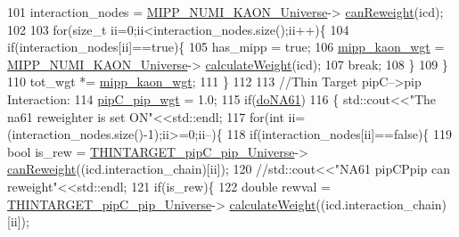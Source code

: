 \begin{DoxyCode}
101       interaction\_nodes = \hyperlink{class_neutrino_flux_reweight_1_1_reweight_driver_a58a8d80767fec9b87d60c1b548571d8b}{MIPP\_NUMI\_KAON\_Universe}->
      \hyperlink{class_neutrino_flux_reweight_1_1_m_i_p_p_numi_kaon_yields_reweighter_a6ca3bcd0846fd600f51988a2e396aafb}{canReweight}(icd);
102 
103       \textcolor{keywordflow}{for}(\textcolor{keywordtype}{size\_t} ii=0;ii<interaction\_nodes.size();ii++)\{
104         \textcolor{keywordflow}{if}(interaction\_nodes[ii]==\textcolor{keyword}{true})\{
105           has\_mipp = \textcolor{keyword}{true};
106           \hyperlink{class_neutrino_flux_reweight_1_1_reweight_driver_a908938bcd5304de35956da51a806ef62}{mipp\_kaon\_wgt} = \hyperlink{class_neutrino_flux_reweight_1_1_reweight_driver_a58a8d80767fec9b87d60c1b548571d8b}{MIPP\_NUMI\_KAON\_Universe}->
      \hyperlink{class_neutrino_flux_reweight_1_1_m_i_p_p_numi_kaon_yields_reweighter_ad9503e13848e30f432c297ed70e24134}{calculateWeight}(icd);
107           \textcolor{keywordflow}{break}; 
108         \}
109       \}
110       tot\_wgt *= \hyperlink{class_neutrino_flux_reweight_1_1_reweight_driver_a908938bcd5304de35956da51a806ef62}{mipp\_kaon\_wgt};
111     \}
112 
113 \textcolor{comment}{//Thin Target pipC-->pip Interaction:}
114   \hyperlink{class_neutrino_flux_reweight_1_1_reweight_driver_a61de96d5fb96639323a271dcf0677be0}{pipC\_pip\_wgt} = 1.0;
115   \textcolor{keywordflow}{if}(\hyperlink{class_neutrino_flux_reweight_1_1_reweight_driver_a2bf534e3c1edd88075c4cf720390e2df}{doNA61})
116    \{ std::cout<<\textcolor{stringliteral}{"The na61 reweighter is set ON"}<<std::endl;
117     \textcolor{keywordflow}{for}(\textcolor{keywordtype}{int} ii=(interaction\_nodes.size()-1);ii>=0;ii--)\{
118       \textcolor{keywordflow}{if}(interaction\_nodes[ii]==\textcolor{keyword}{false})\{
119         \textcolor{keywordtype}{bool} is\_rew = \hyperlink{class_neutrino_flux_reweight_1_1_reweight_driver_aee325ba668d837970619500d1fc081eb}{THINTARGET\_pipC\_pip\_Universe}->
      \hyperlink{class_neutrino_flux_reweight_1_1_thin_targetpip_cpip_reweighter_a0a7a18f342e8c88715671e3804dbd1ca}{canReweight}((icd.interaction\_chain)[ii]);
120     \textcolor{comment}{//std::cout<<"NA61 pipCPpip can reweight"<<std::endl;}
121         \textcolor{keywordflow}{if}(is\_rew)\{
122           \textcolor{keywordtype}{double} rewval = \hyperlink{class_neutrino_flux_reweight_1_1_reweight_driver_aee325ba668d837970619500d1fc081eb}{THINTARGET\_pipC\_pip\_Universe}->
      \hyperlink{class_neutrino_flux_reweight_1_1_thin_targetpip_cpip_reweighter_a1491b7320847333a7b6f8b472d4e5ee3}{calculateWeight}((icd.interaction\_chain)[ii]);

\end{DoxyCode}
